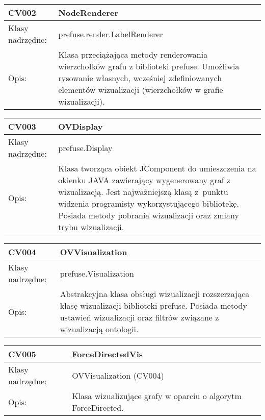 \newpage   %




\begin{longtable}{|m{3.5cm}|m{8.5cm}|} \hline

CV002 & NodeRenderer \\ \hline
Klasy nadrzędne: &  prefuse.render.LabelRenderer   \\ \hline
Opis: & Klasa przeciążająca metody renderowania wierzchołków grafu z biblioteki prefuse.  Umożliwia rysowanie własnych, 
wcześniej zdefiniowanych elementów wizualizacji (wierzchołków w grafie wizualizacji).  \\ \hline

\end{longtable}

\newpage %


\begin{longtable}{|m{3.5cm}|m{8.5cm}|} \hline

CV003 & OVDisplay \\ \hline
Klasy nadrzędne: &  prefuse.Display   \\ \hline
Opis: &  Klasa tworząca obiekt JComponent do umieszczenia na okienku JAVA zawierający wygenerowany graf z wizualizacją. Jest najważniejszą klasą 
z~punktu widzenia programisty wykorzystującego bibliotekę. Posiada metody pobrania wizualizacji oraz zmiany trybu wizualizacji.    \\ \hline

\end{longtable}

\begin{longtable}{|m{3.5cm}|m{8.5cm}|} \hline

CV004 & OVVisualization \\ \hline
Klasy nadrzędne: &  prefuse.Visualization   \\ \hline
Opis: &  Abstrakcyjna klasa obsługi wizualizacji rozszerzająca klasę wizualizacji biblioteki prefuse. Posiada metody ustawień wizualizacji
 oraz filtrów związane z wizualizacją ontologii. \\ \hline

\end{longtable}

\begin{longtable}{|m{3.5cm}|m{8.5cm}|} \hline

CV005 & ForceDirectedVis \\ \hline
Klasy nadrzędne: & OVVisualization (CV004)  \\ \hline
Opis: &  Klasa wizualizujące grafy w oparciu o algorytm ForceDirected.   \\ \hline

\end{longtable}

